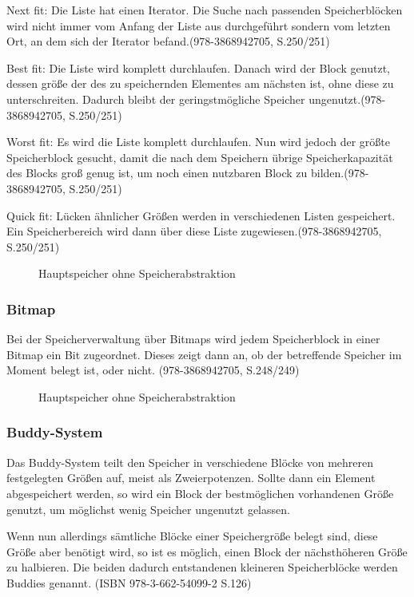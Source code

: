 Next fit: Die Liste hat einen Iterator. Die Suche nach passenden Speicherblöcken wird nicht immer vom Anfang der Liste aus durchgeführt sondern vom letzten Ort, an dem sich der Iterator befand.(978-3868942705, S.250/251)

Best fit: Die Liste wird komplett durchlaufen. Danach wird der Block genutzt, dessen größe der des zu speichernden Elementes am nächsten ist, ohne diese zu unterschreiten. Dadurch bleibt der geringstmögliche Speicher ungenutzt.(978-3868942705, S.250/251)

Worst fit: Es wird die Liste komplett durchlaufen. Nun wird jedoch der größte Speicherblock gesucht, damit die nach dem Speichern übrige Speicherkapazität des Blocks groß genug ist, um noch einen nutzbaren Block zu bilden.(978-3868942705, S.250/251)

Quick fit: Lücken ähnlicher Größen werden in verschiedenen Listen gespeichert. Ein Speicherbereich wird dann über diese Liste zugewiesen.(978-3868942705, S.250/251)

\begin{figure}[htb]
	\centering
	\caption{Hauptspeicher ohne Speicherabstraktion}
\end{figure}

\subsubsection{Bitmap}
Bei der Speicherverwaltung über Bitmaps wird jedem Speicherblock in einer Bitmap ein Bit zugeordnet. Dieses zeigt dann an, ob der betreffende Speicher im Moment belegt ist, oder nicht. (978-3868942705, S.248/249)

\begin{figure}[htb]
	\centering
	\caption{Hauptspeicher ohne Speicherabstraktion}
\end{figure}

\subsubsection{Buddy-System}
Das Buddy-System teilt den Speicher in verschiedene Blöcke von mehreren festgelegten Größen auf, meist als Zweierpotenzen. Sollte dann ein Element abgespeichert werden, so wird ein Block der bestmöglichen vorhandenen Größe genutzt, um möglichst wenig Speicher ungenutzt gelassen.

Wenn nun allerdings sämtliche Blöcke einer Speichergröße belegt sind, diese Größe aber benötigt wird, so ist es möglich, einen Block der nächsthöheren Größe zu halbieren. Die beiden dadurch entstandenen kleineren Speicherblöcke werden Buddies genannt. (ISBN 978-3-662-54099-2 S.126)

